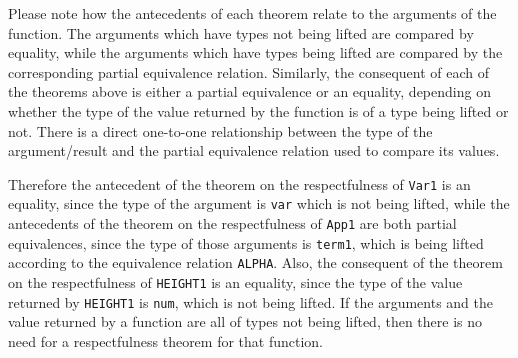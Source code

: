 \documentclass[envcountsame,runningheads]{llncs}
\newcommand{\quotient}{partial equivalence}
\begin{document}
%
% 


Please note how the antecedents of each theorem relate to the arguments
of the function.  The arguments which have types not being lifted
are compared by equality, while the arguments which have types being lifted
are compared by the corresponding \quotient{} relation.  Similarly, the
consequent of each of the theorems above is either a \quotient{} or an
equality, depending on whether the type of the value returned by the
function is of a type being lifted or not.  There is a direct one-to-one
relationship between the type of the argument/result and the 
\quotient{} relation used to compare its values.

Therefore the antecedent of the theorem on the respectfulness of {\tt Var1}
is an equality, since the type of the argument is {\tt var} which is not
being lifted, while the antecedents of the theorem on the respectfulness
of {\tt App1} are both \quotient{}s, since the type of those arguments is
{\tt term1}, which is being lifted according to the equivalence relation
{\tt ALPHA}.  Also, the consequent of the theorem on the respectfulness
of {\tt HEIGHT1} is an equality, since the type of the value returned
by {\tt HEIGHT1} is {\tt num}, which is not being lifted.  If the
arguments and the value returned by a function are all of types
not being lifted, then there is no need for a respectfulness theorem
for that function.
\end{document}
